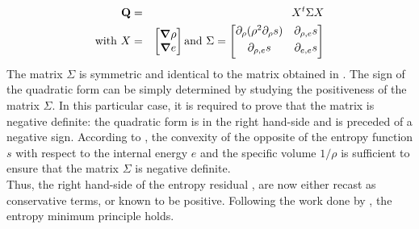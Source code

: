 %
\begin{eqnarray}
\mathbf{Q} &=& X^t \Sigma X \nonumber \\
\text{with } X &=& \begin{bmatrix}
\boldsymbol{\nabla} \rho \\
\boldsymbol{\nabla} e 
\end{bmatrix}
\text{and } \Sigma = \begin{bmatrix}
       \partial_{\rho} (\rho^2 \partial_{\rho} s) & \partial_{\rho,e} s  \\[0.3em]
       \partial_{\rho,e} s & \partial_{e,e} s           \\[0.3em]
     \end{bmatrix} \nonumber 
\end{eqnarray}
%
The matrix $\Sigma$ is symmetric and identical to the matrix obtained in \cite{jlg}. The sign of the quadratic form can be simply determined by studying the positiveness of the matrix $\Sigma$. In this particular case, it is required to prove that the matrix is negative definite: the quadratic form is in the right hand-side and is preceded of a negative sign. According to \cite{jlg}, the convexity of the opposite of the entropy function $s$ with respect to the internal energy $e$ and the specific volume $1/ \rho$ is sufficient to ensure that the matrix $\Sigma$ is negative definite. \\
Thus, the right hand-side of the entropy residual , are now either recast as conservative terms, or known to be positive. Following the work done by \cite{jlg}, the entropy minimum principle holds.

\pagebreak{}